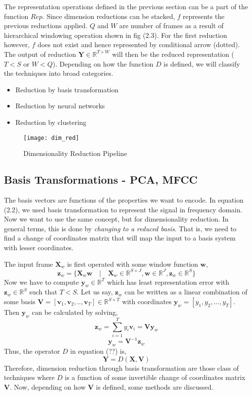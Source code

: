 \noindent The representation operations defined in the previous section can be a part of the function $Rep$. Since dimension reductions can be stacked, $f$ represents the previous reductions applied. $Q$ and $W$ are number of frames as a result of hierarchical windowing operation shown in fig (2.3). For the first reduction however, $f$ does not exist and hence represented by conditional arrow (dotted). The output of reduction $\textbf{Y} \in \mathbb{R}^{T \times W}$ will then be the reduced representation ($T < S$ or $W < Q$). Depending on how the function $D$ is defined, we will classify the techniques into broad categories.
\begin{itemize}
  \item Reduction by \gls{basis} transformation
  \item Reduction by neural networks
  \item Reduction by clustering 
\end{itemize} 
\begin{figure}[h] 
\centering
\texttt{[image: dim\_red]}
\caption{Dimensionality Reduction Pipeline}
 \label{fig:Dimensionality Reduction}
 \end{figure}
\FloatBarrier
\bigskip

\subsection{Basis Transformations - PCA, MFCC}

The \gls{basis} vectors are functions of the properties we want to encode. In equation (2.2), we used \gls{basis transformation} to represent the signal in frequency domain. Now we want to use the same concept, but for dimensionality reduction. In general terms, this is done by \textit{changing to a reduced basis}. That is, we need to find a   \gls{change of coordinates matrix} that will map the input to a basis system with lesser coordinates. 
\bigskip

\noindent The input frame $\textbf{X}_{w}$ is first operated with some window function $\textbf{w}$,
\[
  \textbf{z}_{w} = \{\textbf{X}_{w}\textbf{w} \quad | \quad \textbf{X}_{w} \in \mathbb{R}^{S \times J}, \textbf{w} \in \mathbb{R}^{J}, \textbf{z}_{w} \in \mathbb{R}^{S}\}
\]    
Now we have to compute $\textbf{y}_{w} \in \mathbb{R}^{T}$ which has least representation error with $\textbf{z}_{w} \in \mathbb{R}^{S}$ such that $T < S$. Let us say, $\textbf{z}_{w}$ can be written as a \gls{linear combination} of some \gls{basis} $\textbf{V} = [\textbf{v}_{1}, \textbf{v}_{2}, ..,\textbf{v}_{T}] \in \mathbb{R}^{S \times T}$ with coordinates $\textbf{y}_{w} = [y_{1}, y_{2},...,y_{T}]$. Then $\textbf{y}_{w}$ can be calculated by solving,
\[
\textbf{z}_{w} = \displaystyle\sum_{i=1}^{T}y_{i}\textbf{v}_{i} = \textbf{V}\textbf{y}_{w}
\]
\[
\textbf{y}_{w} = \textbf{V}^{-1}\textbf{z}_{w}
\]
Thus, the operator $D$ in equation (??) is,
\[
\textbf{Y} = D(\textbf{X}, \textbf{V})
\]
Therefore, dimension reduction through \gls{basis transformation} are those class of techniques where $D$ is a function of some invertible \gls{change of coordinates matrix} $\textbf{V}$. Now, depending on how $\textbf{V}$ is defined, some methods are discussed.

